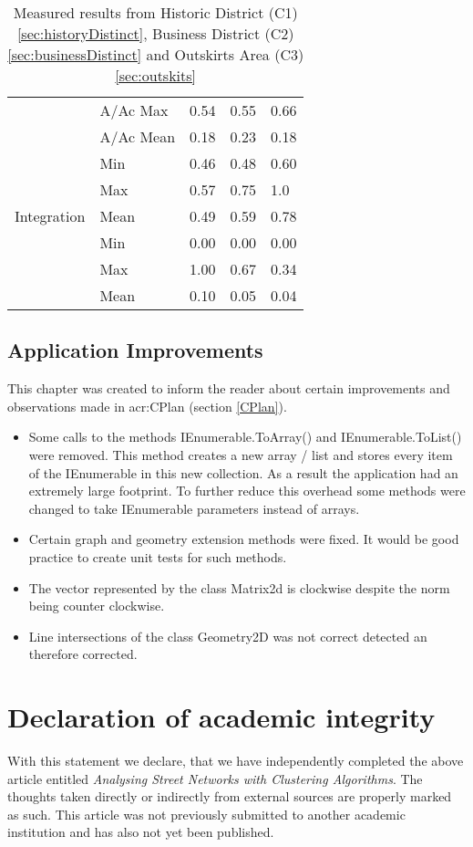\begin{table}[h]
\begin{center}
\begin{tabular}{ |l|l|l|l|l| }
            & A/Ac Max & 0.54 & 0.55 & 0.66 \\
            & A/Ac Mean & 0.18 & 0.23 & 0.18 \\
            \hline
            \multirow{5}{*}{Integration} 
            & Min & 0.46 & 0.48 & 0.60 \\
            & Max & 0.57 & 0.75 & 1.0 \\
            & Mean & 0.49 & 0.59 & 0.78 \\
            \hline
            \multirow{5}{*}{Choice}
            & Min & 0.00 & 0.00 & 0.00 \\
            & Max & 1.00 & 0.67 & 0.34 \\
            & Mean & 0.10 & 0.05 & 0.04 \\
            \hline
        \end{tabular}
        \caption{Measured results from Historic District (C1) \ref{sec:historyDistinct}, Business District (C2) \ref{sec:businessDistinct} and Outskirts Area (C3) \ref{sec:outskits}}
    \end{center}
\end{table}

\pagebreak
\section{Application Improvements}
This chapter was created to inform the reader about certain improvements and observations made in \gls{acr:CPlan} (section \ref{CPlan}).
\begin{itemize}
    \item Some calls to the methods IEnumerable.ToArray() and IEnumerable.ToList() were removed. This method creates a new array / list and stores every item of the IEnumerable in this new collection. As a result the application had an extremely large footprint. To further reduce this overhead some methods were changed to take IEnumerable parameters instead of arrays.
    \item Certain graph and geometry extension methods were fixed. It would be good practice to create unit tests for such methods.
    \item The vector represented by the class Matrix2d is clockwise despite the norm being counter clockwise.
    \item Line intersections of the class Geometry2D was not correct detected an therefore corrected.
\end{itemize}

\chapter{Declaration of academic integrity}
With this statement we declare, that we have independently completed the above article entitled \textit{Analysing Street Networks with Clustering Algorithms}.
The thoughts taken directly or indirectly from external sources are properly marked as such. This article was not previously submitted to another academic institution and has also not yet been published.\\

